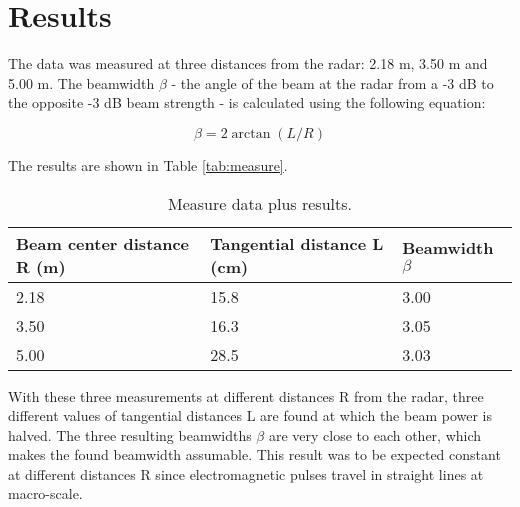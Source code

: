 \documentclass[final]{scrreprt} %
\begin{document}
\section{Results}
The data was measured at three distances from the radar: 2.18 \unit{m}, 3.50 \unit{m} and 5.00 \unit{m}. The beamwidth $\beta$ - the angle of the beam at the radar from a -3 dB to the opposite -3 dB beam strength - is calculated using the following equation:

\begin{equation}
	\beta = 2 \arctan(L / R)
\end{equation}

 The results are shown in Table \ref{tab:measure}.

\begin{table}[h]
\begin{center}
\begin{tabular}{ | l | l | l | }
    \hline
    Beam center distance R (m) & Tangential distance L (cm) & Beamwidth $\beta$ \\\hline
    2.18 & 15.8 & 3.00 \\\hline
    3.50 & 16.3 & 3.05 \\\hline
    5.00 & 28.5 & 3.03 \\\hline
\end{tabular}
\caption{Measure data plus results.}
\end{center}
\end{table}
\label{tab:measure}

With these three measurements at different distances R from the radar, three different values of tangential distances L are found at which the beam power is halved. The three resulting beamwidths $\beta$ are very close to each other, which makes the found beamwidth assumable. This result was to be expected constant at different distances R since electromagnetic pulses travel in straight lines at macro-scale.
\end{document}
